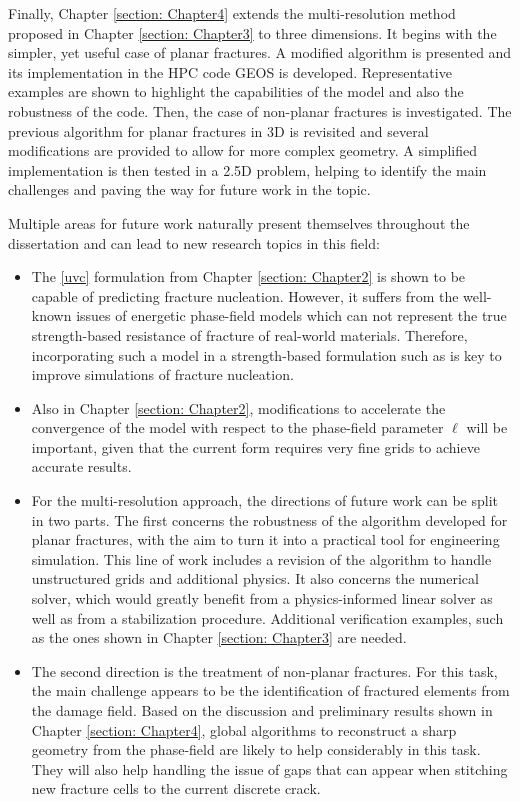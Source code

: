 Finally, Chapter \ref{section: Chapter4} extends the multi-resolution method proposed in Chapter \ref{section: Chapter3} to three dimensions. It begins with the simpler, yet useful case of planar fractures. A modified algorithm is presented and its implementation in the HPC code GEOS is developed. Representative examples are shown to highlight the capabilities of the model and also the robustness of the code. Then, the case of non-planar fractures is investigated. The previous algorithm for planar fractures in 3D is revisited and several modifications are provided to allow for more complex geometry. A simplified implementation is then tested in a 2.5D problem, helping to identify the main challenges and paving the way for future work in the topic.

Multiple areas for future work naturally present themselves throughout the dissertation and can lead to new research topics in this field:

\begin{itemize}
    \item The \eqref{uvc} formulation from Chapter \ref{section: Chapter2} is shown to be capable of predicting fracture nucleation. However, it suffers from the well-known issues of energetic phase-field models which can not represent the true strength-based resistance of fracture of real-world materials. Therefore, incorporating such a model in a strength-based formulation such as \cite{kumar2020revisiting} is key to improve simulations of fracture nucleation. 
    
    \item Also in Chapter \ref{section: Chapter2}, modifications to accelerate the convergence of the model with respect to the phase-field parameter $\ell$ will be important, given that the current form requires very fine grids to achieve accurate results.
    
    \item For the multi-resolution approach, the directions of future work can be split in two parts. The first concerns the robustness of the algorithm developed for planar fractures, with the aim to turn it into a practical tool for engineering simulation. This line of work includes a revision of the algorithm to handle unstructured grids and additional physics. It also concerns the numerical solver, which would greatly benefit from a physics-informed linear solver as well as from a stabilization procedure. Additional verification examples, such as the ones shown in Chapter \ref{section: Chapter3} are needed.
    
    \item The second direction is the treatment of non-planar fractures. For this task, the main challenge appears to be the identification of fractured elements from the damage field. Based on the discussion and preliminary results shown in Chapter \ref{section: Chapter4}, global algorithms to reconstruct a sharp geometry from the phase-field are likely to help considerably in this task. They will also help handling the issue of gaps that can appear when stitching new fracture cells to the current discrete crack. 
\end{itemize}

